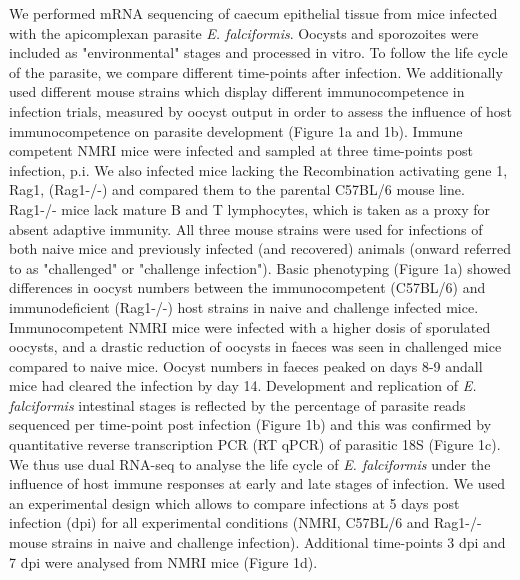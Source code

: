 \documentclass{bmcart}
\begin{document}
We performed mRNA sequencing of caecum epithelial tissue from mice infected with
the apicomplexan parasite \textit{E. falciformis}. Oocysts and
sporozoites were included as "environmental" stages and processed
in vitro. To follow the life cycle of the parasite, we
compare different time-points after infection. We additionally used different mouse strains which display different immunocompetence in infection trials, measured by oocyst output in order to assess the influence of host immunocompetence on parasite development (Figure 1a and 1b). Immune competent NMRI mice were infected and sampled at three time-points post infection, p.i. We also infected mice lacking the Recombination activating gene 1, Rag1, (Rag1-/-) and compared them to the parental C57BL/6 mouse line. Rag1-/- mice lack mature B and T lymphocytes, which is taken as a proxy for absent adaptive immunity. All three mouse strains were used for infections of both naive mice and previously infected (and recovered) animals (onward referred to as "challenged" or "challenge infection").
\newline Basic phenotyping (Figure 1a) showed differences in oocyst numbers between the immunocompetent (C57BL/6) and immunodeficient (Rag1-/-) host strains in naive and challenge infected mice. Immunocompetent NMRI mice were infected with a higher dosis of sporulated oocysts, and a drastic reduction of oocysts in faeces was seen in challenged mice compared to naive mice. Oocyst numbers in faeces peaked on days 8-9 andall mice had cleared the infection by day 14. Development and replication of \textit{E. falciformis} intestinal stages is reflected by the percentage of parasite reads sequenced per time-point post infection (Figure 1b) and this was confirmed by quantitative reverse transcription PCR (RT qPCR) of parasitic 18S (Figure 1c).
\newline We thus use dual RNA-seq to analyse the life cycle of \textit{E. falciformis} under
the influence of host immune responses at early and late stages of infection. We used an experimental
design which allows to compare infections at 5 days post infection (dpi) for all experimental
conditions (NMRI, C57BL/6 and Rag1-/- mouse strains in naive and challenge infection). Additional time-points 3 dpi and 7 dpi were analysed from NMRI mice (Figure 1d).
\end{document}
